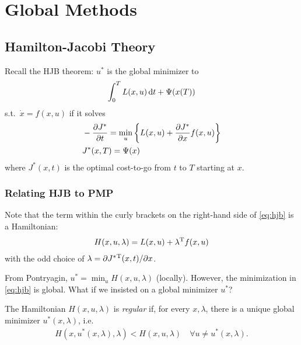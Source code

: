\chapter{Global Methods}

\section{Hamilton-Jacobi Theory}
Recall the HJB theorem: $u^*$ is the global minimizer to
\begin{gather}
  \int_0^T L(x,u)\mathop{}\!\mathrm{d} t + \Psi(x(T))
\end{gather}
s.t.\ $\dot x=f(x,u)$ if it solves
\begin{align}
  & -\frac{\partial J^*}{\partial t} = \min_u \left\{ L(x,u) + \frac{\partial J^*}{\partial x} f(x,u) \right\} \label{eq:hjb} \\
  & J^*(x,T) = \Psi(x)
\end{align}
where $J^*(x,t)$ is the optimal cost-to-go from $t$ to $T$ starting at $x$.

\subsection{Relating HJB to PMP}
Note that the term within the curly brackets on the right-hand side of \eqref{eq:hjb} is a Hamiltonian:
\begin{gather}
  H(x,u,\lambda) = L(x,u) + \lambda^\text{T} f(x,u)
\end{gather}
with the odd choice of $\lambda=\partial J^*{}^\text{T}(x,t)/\partial x$.

From Pontryagin, $u^*=\min_u H(x,u,\lambda)$ (locally). However, the minimization in \eqref{eq:hjb} is global. What if we insisted on a global minimizer $u^*$?

\begin{defi}
  The Hamiltonian $H(x,u,\lambda)$ is \emph{regular} if, for every $x,\lambda$, there is a unique global minimizer $u^*(x,\lambda)$, i.e.\
  \begin{gather}
    H(x,u^*(x,\lambda),\lambda) < H(x,u,\lambda) \quad \forall u\neq u^*(x,\lambda).
  \end{gather}
\end{defi}

